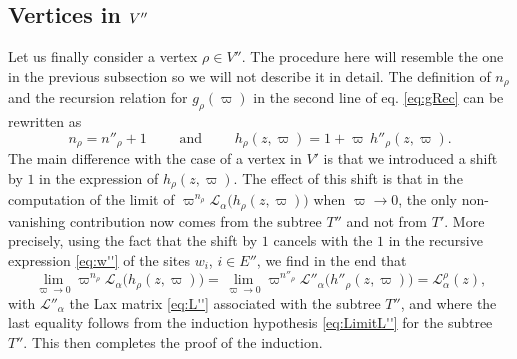 \documentclass{article}
\def\Lc{\mathcal{L}}
\begin{document}
\subsection{Vertices in \texorpdfstring{$\boldmath{V''}$}{V''}}

Let us finally consider a vertex $\rho\in V''$. The procedure here will resemble the one in the previous subsection so we will not describe it in detail. The definition of $n_\rho$ and the recursion relation for $g_\rho(\varpi)$ in the second line of eq. \eqref{eq:gRec} can be rewritten as
\begin{equation}
n_\rho = n''_\rho + 1 \qquad \text{ and } \qquad h_\rho(z,\varpi) = 1 + \varpi\,h''_\rho(z,\varpi).
\end{equation}
The main difference with the case of a vertex in $V'$ is that we introduced a shift by $1$ in the expression of $h_\rho(z,\varpi)$. The effect of this shift is that in the computation of the limit of $\varpi^{n_\rho} \Lc_\alpha \bigl( h_\rho(z,\varpi) \bigr)$ when $\varpi\to 0$, the only non-vanishing contribution now comes from the subtree $T''$ and not from $T'$. More precisely, using the fact that the shift by $1$ cancels with the $1$ in the recursive expression \eqref{eq:w''} of the sites $w_{i}$, $i\in E''$, we find in the end that
\begin{equation}
\lim_{\varpi\to 0} \varpi^{n_\rho} \Lc_\alpha \bigl( h_\rho(z,\varpi)\bigr) = \lim_{\varpi\to 0} \varpi^{n''_\rho} \Lc''_\alpha \bigl( h''_\rho(z,\varpi)\bigr) = \Lc_\alpha^\rho(z),
\end{equation}
with $\Lc''_\alpha$ the Lax matrix \eqref{eq:L''} associated with the subtree $T''$, and where the last equality follows from the induction hypothesis \eqref{eq:LimitL''} for the subtree $T''$. This then completes the proof of the induction.
\end{document}
